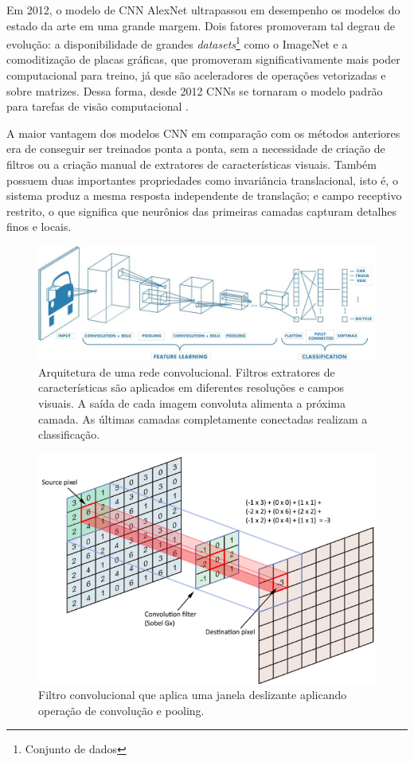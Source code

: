 Em 2012, o modelo de CNN AlexNet ultrapassou em desempenho os modelos do estado da arte em uma grande margem. Dois fatores promoveram tal degrau de evolução: a disponibilidade de grandes \textit{datasets}\footnote{Conjunto de dados} como o ImageNet e a comoditização de placas gráficas, que promoveram significativamente mais poder computacional para treino, já que são aceleradores de operações vetorizadas e sobre matrizes. Dessa forma, desde 2012 CNNs se tornaram o modelo padrão para tarefas de visão computacional \cite{alom2018history}.

A maior vantagem dos modelos CNN em comparação com os métodos anteriores era de conseguir ser treinados ponta a ponta, sem a necessidade de criação de filtros ou a criação manual de extratores de características visuais. Também possuem duas importantes propriedades como invariância translacional, isto é, o sistema produz a mesma resposta independente de translação; e campo receptivo restrito, o que significa que neurônios das primeiras camadas capturam detalhes finos e locais.
\begin{figure}[!ht]
    \centering
    \includegraphics[width=0.95\columnwidth]{
        Imagens/CNN_mathworks.jpg
    }
    \caption{Arquitetura de uma rede convolucional. Filtros extratores de características são aplicados em diferentes resoluções e campos visuais. A saída de cada imagem convoluta alimenta a próxima camada. As últimas camadas completamente conectadas realizam a classificação.}
    \label{fig:cnn}
\end{figure}

\begin{figure}[!ht]
    \centering
    \includegraphics[width=0.6\columnwidth]{
        Imagens/operacao_conv.png
    }
    \caption{
 Filtro convolucional que aplica uma janela deslizante aplicando operação de convolução e pooling.  
    }
    \label{fig:conv}
\end{figure}

